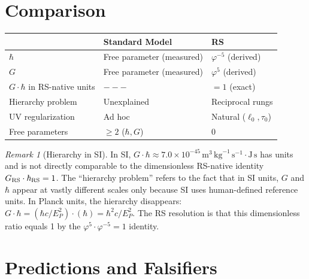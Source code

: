 \documentclass[12pt,a4paper]{article}
\theoremstyle{definition}
\theoremstyle{remark}
\newtheorem{remark}[theorem]{Remark}
\begin{document}
\section{Comparison}
\label{sec:comparison}

\begin{center}
\renewcommand{\arraystretch}{1.3}
\begin{tabular}{@{}lll@{}}
\toprule
& \textbf{Standard Model} & \textbf{RS} \\
\midrule
$\hbar$ & Free parameter (measured) & $\varphi^{-5}$ (derived) \\
$G$ & Free parameter (measured) & $\varphi^5$ (derived) \\
$G \cdot \hbar$ in RS-native units & $---$ & $= 1$ (exact) \\
Hierarchy problem & Unexplained & Reciprocal rungs \\
UV regularization & Ad hoc & Natural ($\ell_0, \tau_0$) \\
Free parameters & $\geq 2$ ($\hbar, G$) & 0 \\
\bottomrule
\end{tabular}
\end{center}

\begin{remark}[Hierarchy in SI]
In SI, $G \cdot \hbar \approx 7.0 \times 10^{-45}\,\mathrm{m}^3\,\mathrm{kg}^{-1}\,\mathrm{s}^{-1} \cdot \mathrm{J\,s}$
has units and is not directly comparable to the dimensionless
RS-native identity $G_{\rm RS} \cdot \hbar_{\rm RS} = 1$.  The
``hierarchy problem'' refers to the fact that in SI units, $G$
and $\hbar$ appear at vastly different scales only because SI
uses human-defined reference units.  In Planck units, the
hierarchy disappears: $G \cdot \hbar = (\hbar c / E_P^2)
\cdot (\hbar) = \hbar^2 c / E_P^2$.  The RS resolution is that
this dimensionless ratio equals 1 by the $\varphi^5 \cdot \varphi^{-5}
= 1$ identity.
\end{remark}

\section{Predictions and Falsifiers}
\label{sec:predictions}
\end{document}
